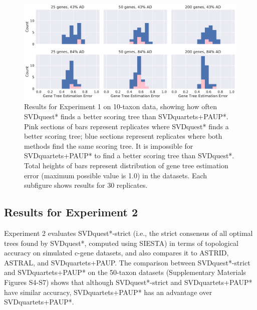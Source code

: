 \begin{figure}
  \centering
  \includegraphics[width=\textwidth]{svdquest-figs/svdquestplus_vs_paup_better_score_10tax.pdf}
\caption[Comparison of SVDquest* and SVDquartets+PAUP* with respect to MQSST scores on 10-taxon simulated data]{Results for Experiment 1 on 10-taxon data, showing how
    often SVDquest* finds a better scoring tree than SVDquartets+PAUP*. Pink
    sections of bars represent replicates where SVDquest* finds a
    better scoring tree; blue sections represent replicates where both
    methods find the same scoring tree. It is impossible for SVDquartets+PAUP* to
    find a better scoring tree than SVDquest*. Total heights of bars
    represent distribution of gene tree estimation error (maximum possible value is 1.0) in the
    datasets.  
      Each subfigure shows results for 30 replicates.   
    }\label{svdquest::fig:exp1_10}
\end{figure}


\clearpage
\subsection{Results for Experiment 2}

Experiment 2 evaluates  %
SVDquest*-strict (i.e., 
the strict consensus of all optimal trees found by SVDquest*, computed using SIESTA) 
in terms of topological accuracy 
on simulated c-gene datasets, and also compares it to ASTRID, ASTRAL, and SVDquartets+PAUP.  
{The comparison between SVDquest*-strict and SVDquartets+PAUP* on the 50-taxon datasets (Supplementary Materials Figures S4-S7) shows that although SVDquest*-strict and SVDquartets+PAUP* have similar accuracy, SVDquartets+PAUP* has an advantage over SVDquartets+PAUP*. }



